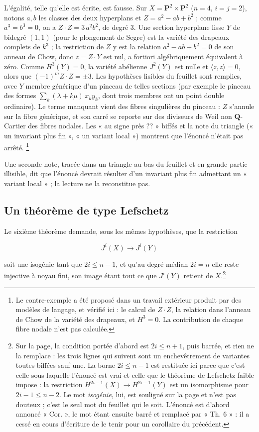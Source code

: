 \documentclass[11pt,a4paper]{article}
\begin{document}
L'égalité, telle qu'elle est écrite, est fausse. Sur $X = \mathbf P^{2}\times
\mathbf P^{2}$ ($n=4$, $i=j=2$), notons $a, b$ les classes des deux
hyperplans et $Z = a^{2}-ab+b^{2}$ ; comme $a^{3}=b^{3}=0$, on a
$Z\cdot Z = 3\,a^{2}b^{2}$, de degré $3$. Une section hyperplane lisse $Y$ de
bidegré $(1,1)$ (pour le plongement de Segre) est la variété des drapeaux
complets de $k^{3}$ ; la restriction de $Z$ y est la relation
$a^{2}-ab+b^{2}=0$ de son anneau de Chow, donc $z = Z\cdot Y$ est nul, a
fortiori algébriquement équivalent à zéro. Comme $H^{3}(Y)=0$, la variété
abélienne $J^{2}(Y)$ est nulle et $\langle z, z\rangle = 0$, alors que
$(-1)^{m} Z\cdot Z = \pm 3$. Les hypothèses lisibles du feuillet sont
remplies, avec $Y$ membre générique d'un pinceau de telles sections (par
exemple le pinceau des formes $\sum_{k}(\lambda + k\mu)\,x_{k}y_{k}$, dont
trois membres ont un point double ordinaire). Le terme manquant vient des
fibres singulières du pinceau : $Z$ s'annule sur la fibre générique, et son
carré se reporte sur des diviseurs de Weil non $\mathbf Q$-Cartier des fibres
nodales. Les « au signe près ?? » biffés et la note du triangle (« un invariant
plus fin », « un variant local ») montrent que l'énoncé n'était pas arrêté.
\footnote{Le contre-exemple a été proposé dans un travail extérieur produit par
des modèles de langage, et vérifié ici : le calcul de $Z\cdot Z$, la relation
dans l'anneau de Chow de la variété des drapeaux, et $H^{3}=0$. La contribution
de chaque fibre nodale n'est pas calculée.}

Une seconde note, tracée dans un triangle au bas du feuillet et en grande
partie illisible, dit que l'énoncé devrait résulter d'un invariant plus fin
admettant un « variant local » ; la lecture ne la reconstitue pas.

\subsection*{Un théorème de type Lefschetz}

Le sixième théorème demande, sous les mêmes hypothèses, que la restriction

\[
  J^{i}(X) \longrightarrow J^{i}(Y)
\]

soit une isogénie tant que $2i \leq n-1$, et qu'au degré médian $2i = n$ elle
reste injective à noyau fini, son image étant tout ce que $J^{i}(Y)$ retient de
$X$.\footnote{Sur la page, la condition portée d'abord est $2i \leq n+1$, puis
barrée, et rien ne la remplace : les trois lignes qui suivent sont un
enchevêtrement de variantes toutes biffées sauf une. La borne $2i\leq n-1$ est
restituée ici parce que c'est celle sous laquelle l'énoncé est vrai et celle que
le théorème de Lefschetz faible impose : la restriction
$H^{2i-1}(X)\to H^{2i-1}(Y)$ est un isomorphisme pour $2i-1 \leq n-2$. Le mot
\emph{isogénie}, lui, est souligné sur la page et n'est pas douteux ; c'est le
seul mot du feuillet qui le soit. L'énoncé est d'abord annoncé « Cor. », le mot
étant ensuite barré et remplacé par « Th. 6 » : il a cessé en cours d'écriture
de le tenir pour un corollaire du précédent.}
\end{document}
